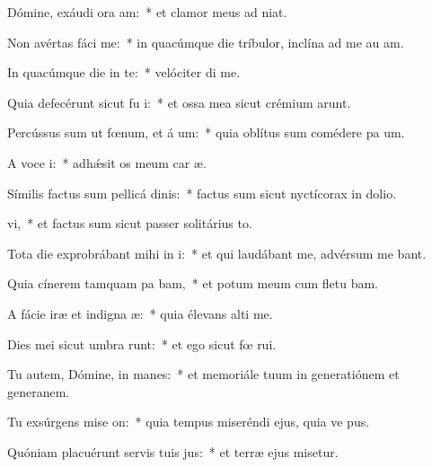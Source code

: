 \item Dómine, exáudi ora am:~* et clamor meus ad  niat.
\item Non avértas fáci   me:~* in quacúmque die tríbulor, inclína ad me au am.
\item In quacúmque die in te:~* velóciter di me.
\item Quia defecérunt sicut fu  i:~* et ossa mea sicut crémium arunt.
\item Percússus sum ut fœnum, et á  um:~* quia oblítus sum comédere pa um.
\item A voce  i:~* adhǽsit os meum car æ.
\item Símilis factus sum pellicá dinis:~* factus sum sicut nyctícorax in dolio.
\item {}vi,~* et factus sum sicut passer solitárius  to.
\item Tota die exprobrábant mihi in i:~* et qui laudábant me, advérsum me bant.
\item Quia cínerem tamquam pa bam,~* et potum meum cum fletu bam.
\item A fácie iræ et indigna æ:~* quia élevans alti me.
\item Dies mei sicut umbra runt:~* et ego sicut fœ rui.
\item Tu autem, Dómine, in  manes:~* et memoriále tuum in generatiónem et generanem.
\item Tu exsúrgens mise on:~* quia tempus miseréndi ejus, quia ve pus.
\item Quóniam placuérunt servis tuis  jus:~* et terræ ejus misetur.
